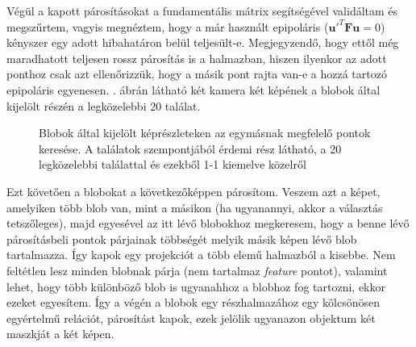 Végül a kapott párosításokat a fundamentális mátrix segítségével validáltam és megszűrtem, vagyis megnéztem, hogy a már használt epipoláris ($\mathbf{u}'^T \mathbf{F} \mathbf{u} = 0$) kényszer egy adott hibahatáron belül teljesült-e. Megjegyzendő, hogy ettől még maradhatott teljesen rossz párosítás is a halmazban, hiszen ilyenkor az adott ponthoz csak azt ellenőrizzük, hogy a másik pont rajta van-e a hozzá tartozó epipoláris egyenesen. . ábrán látható két kamera két képének a blobok által kijelölt részén a legközelebbi 20 találat. 

\begin{figure}[tbh]
\centering


\caption{Blobok által kijelölt képrészleteken az egymásnak megfelelő pontok keresése. A találatok szempontjából érdemi rész látható, a 20 legközelebbi találattal és ezekből 1-1 kiemelve közelről \label{fig:multi-obj-matches}}
\end{figure}

Ezt követően a blobokat a következőképpen párosítom. Veszem azt a képet, amelyiken több blob van, mint a másikon (ha ugyanannyi, akkor a választás tetszőleges), majd egyesével az itt lévő blobokhoz megkeresem, hogy a benne lévő párosításbeli pontok párjainak többségét melyik másik képen lévő blob tartalmazza. Így kapok egy projekciót a több elemű halmazból a kisebbe. Nem feltétlen lesz minden blobnak párja (nem tartalmaz \textit{feature} pontot), valamint lehet, hogy több különböző blob is ugyanahhoz a blobhoz fog tartozni, ekkor ezeket egyesítem. Így a végén a blobok egy részhalmazához egy kölcsönösen egyértelmű relációt, párosítást kapok, ezek jelölik ugyanazon objektum két maszkját a két képen. %

